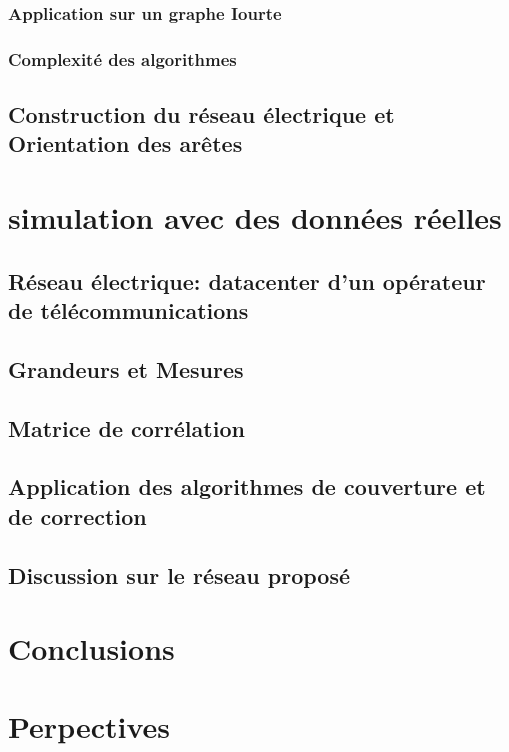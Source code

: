 \documentclass[onecolumn, 12pt]{book}
\begin{document}
		\subsection{Application sur un graphe Iourte}
		\subsection{Complexit\'e des algorithmes}
	\section{Construction du r\'eseau \'electrique et Orientation des ar\^etes }
\chapter{simulation avec des donn\'ees r\'eelles}
	\section{R\'eseau \'electrique: datacenter d'un op\'erateur de t\'el\'ecommunications }
	\section{Grandeurs et Mesures}
	\section{Matrice de corr\'elation}
	\section{Application des algorithmes de couverture et de correction}
	\section{Discussion sur le r\'eseau propos\'e}
\chapter{Conclusions}
\chapter{Perpectives}
\tableofcontents
 
\end{document}
